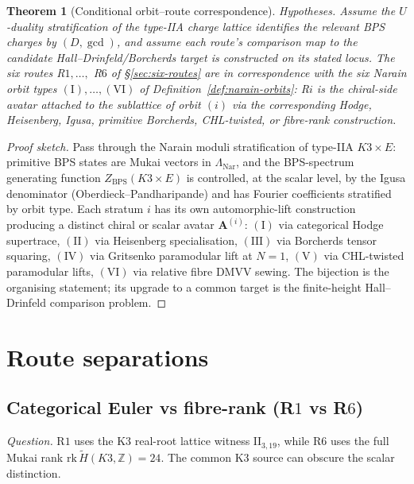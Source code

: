 \documentclass[11pt]{article}
\newtheorem{theorem}{Theorem}[section]
\begin{document}
\begin{theorem}[Conditional orbit--route correspondence]
\label{thm:orbit-route}
\noindent\emph{Hypotheses.} Assume the $U$-duality stratification of the
type-IIA charge lattice identifies the relevant BPS charges by
$(D,\gcd)$, and assume each route's comparison map to the candidate
Hall--Drinfeld/Borcherds target is constructed on its stated locus.
The six routes R$1, \ldots,$ R$6$ of \S\ref{sec:six-routes} are in
correspondence with the six Narain orbit types
$(\mathrm I), \ldots, (\mathrm{VI})$ of
Definition~\ref{def:narain-orbits}:
R$i$ is the chiral-side avatar attached to the sublattice of orbit
$(i)$ via the corresponding Hodge, Heisenberg, Igusa, primitive
Borcherds, CHL-twisted, or fibre-rank construction.
\end{theorem}

\begin{proof}[Proof sketch]
Pass through the Narain moduli stratification of
type-IIA $K3 \times E$: primitive BPS states are Mukai vectors
in $\Lambda_{\mathrm{Nar}}$, and the BPS-spectrum generating function
$Z_{\mathrm{BPS}}(K3 \times E)$ is controlled, at the scalar level, by
the Igusa denominator (Oberdieck--Pandharipande) and has
Fourier coefficients stratified by orbit type. Each stratum $i$
has its own automorphic-lift construction producing a distinct
chiral or scalar avatar $\mathbf A^{(i)}$: $(\mathrm I)$ via
categorical Hodge supertrace, $(\mathrm{II})$ via Heisenberg
specialisation, $(\mathrm{III})$ via
Borcherds tensor squaring, $(\mathrm{IV})$ via Gritsenko paramodular
lift at $N=1$, $(\mathrm V)$ via CHL-twisted paramodular lifts,
$(\mathrm{VI})$ via relative fibre DMVV sewing. The bijection is
the organising statement; its upgrade to a common target is the
finite-height Hall--Drinfeld comparison problem.
\end{proof}

\section{Route separations}
\label{sec:route-separations}

\subsection{Categorical Euler vs fibre-rank (R$1$ vs R$6$)}
\label{subsec:route-mukai-fiber}

\emph{Question.} R$1$ uses the K3 real-root lattice witness
$\mathrm{II}_{3,19}$, while R$6$ uses the full Mukai rank
$\mathrm{rk}\,\widetilde H(K3,\mathbb Z)=24$. The common K3 source
can obscure the scalar distinction.
\end{document}
